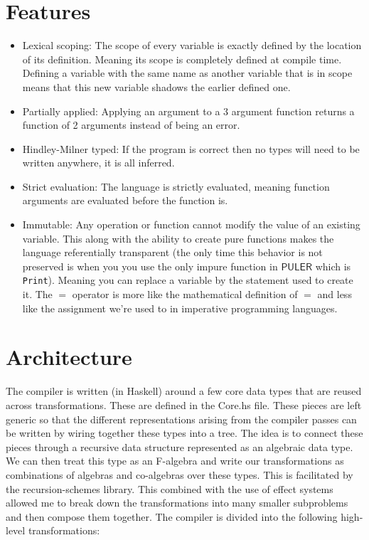\documentclass{article} %
\newcommand{\PULER}{\mathsf{PULER}}
\begin{document}
\section {Features}
    \begin{itemize}
        \item Lexical scoping: The scope of every variable is exactly defined by the location of its definition. Meaning its scope is completely defined at compile time. Defining a variable with the same name as another variable that is in scope means that this new variable shadows the earlier defined one.
        \item Partially applied: Applying an argument to a 3 argument function returns a function of 2 arguments instead of being an error.
        \item Hindley-Milner typed: If the program is correct then no types will need to be written anywhere, it is all inferred.
        \item Strict evaluation: The language is strictly evaluated, meaning function arguments are evaluated before the function is.
        \item Immutable: Any operation or function cannot modify the value of an existing variable. This along with the ability to create pure functions makes the language referentially transparent (the only time this behavior is not preserved is when you you use the only impure function in $\PULER$ which is \texttt{Print}). Meaning you can replace a variable by the statement used to create it. The $=$ operator is more like the mathematical definition of $=$ and less like the assignment we're used to in imperative programming languages.
    \end{itemize}
\section {Architecture}
    The compiler is written (in Haskell) around a few core data types that are reused across transformations. These are defined in the Core.hs file. These pieces are left generic so that the different representations arising from the compiler passes can be written by wiring together these types into a tree. The idea is to connect these pieces through a recursive data structure represented as an algebraic data type. We can then treat this type as an F-algebra and write our transformations as combinations of algebras and co-algebras over these types. This is facilitated by the recursion-schemes library. This combined with the use of effect systems allowed me to break down the transformations into many smaller subproblems and then compose them together.
    The compiler is divided into the following high-level transformations:
\end{document}
